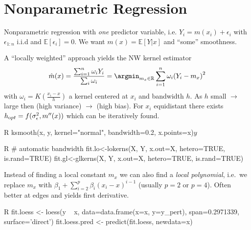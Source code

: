 \section{Nonparametric Regression}\label{sec:nonparametric_regression}
Nonparametric regression with \emph{one} predictor variable, i.e. $Y_{i} = m(x_{i}) + \epsilon_{i}$ with $\epsilon_{1:n}$ i.i.d and $\mathbb{E}[\epsilon_{i}] = 0$. We want $m(x) = \mathbb{E}[Y|x]$ and ``some'' smoothness.

\begin{sectionbox}\nospacing{}
  A ``locally weighted'' approach yields the NW kernel estimator
  \begin{equation}\label{eq:nw_regressor}
    \hat m(x) = \frac{\sum_{i=1}^{n} \omega_{i}Y_{i}}{\sum_{i}\omega_{i}} = \argmin_{m_{x} \in \mathbb{R}}\sum_{i=1}^{n}\omega_{i}{(Y_{i}-m_{x})}^{2}
  \end{equation}
  with $\omega_{i} = K\left(\frac{x_{i}-x}{h}\right)$ a kernel centered at $x_{i}$ and bandwidth $h$.
  As $h$ small $\rightarrow$ large then (high variance) $\rightarrow$ (high bias).
  For $x_{i}$ equidistant there exists $h_{\textrm opt} = f(\sigma_{\epsilon}^{2}, m''(x))$ which can be iteratively found.

  \begin{mintlinebox}{R}
    ksmooth(x, y, kernel="normal", bandwidth=0.2, x.points=x)$y$
  \end{mintlinebox}
  \begin{mintlinebox}{R}
    # automatic bandwidth
    fit.lo<-lokerns(X, Y, x.out=X, hetero=TRUE, is.rand=TRUE)
    fit.gl<-glkerns(X, Y, x.out=X, hetero=TRUE, is.rand=TRUE)
  \end{mintlinebox}
\end{sectionbox}

\begin{sectionbox}\nospacing{}
  Instead of finding a local constant $m_{x}$ we can also find a \emph{local polynomial}, i.e.\ we replace $m_{x}$ with $\beta_{1} + \sum_{i=2}^{p} \beta_{i}{(x_{i}-x)}^{i-1}$ (usually $p=2$ or $p=4$).
  Often better at edges and yields first derivative.
  \begin{mintlinebox}{R}
    fit.loess <- loess(y ~ x, data=data.frame(x=x, y=y_pert), span=0.2971339, surface='direct')
    fit.loess.pred <- predict(fit.loess, newdata=x)
  \end{mintlinebox}
\end{sectionbox}

